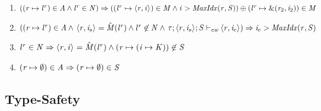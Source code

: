 \begin{enumerate}%
    \item \label{wf:impl-linear-alloc} $ ((\mathit{r} \mapsto {\mathit{l}}^{\mathit{r}}) \in \mathit{A} \wedge {\mathit{l}}^{\mathit{r}} \in \mathit{N}) \Rightarrow \\
          (({\mathit{l}}^{\mathit{r}} \mapsto \langle \mathit{r}, \mathit{i} \rangle ^{}) \in \mathit{M} \wedge
          \mathit{i} > \mathit{MaxIdx}(\mathit{r},\mathit{S}))
          \oplus
          ({\mathit{l}}^{\mathit{r}} \mapsto \text{\&}(\mathit{r}_2,\mathit{i}_2)) \in \mathit{M}
          $

    \item \label{wf:impl-linear-alloc2} $ ((\mathit{r} \mapsto {\mathit{l}}^{\mathit{r}}) \in \mathit{A} \wedge 
    \, \langle \mathit{r}, \mathit{i}_s \rangle ^{} = \hat{\mathit{M}}({\mathit{l}}^{\mathit{r}}) \wedge
    {\mathit{l}}^{\mathit{r}} \not \in \mathit{N} \wedge
    \, \mathit{\tau};\langle \mathit{r}, \mathit{i}_s \rangle ^{};\mathit{S} \vdash_{\textit{ew}} \langle \mathit{r}, \mathit{i}_e \rangle ^{}) \Rightarrow
          \mathit{i}_e > \mathit{MaxIdx}(\mathit{r},\mathit{S})
          $

    \item \label{wf:impl-write-once} $ {\mathit{l}}^{\mathit{r}} \in \mathit{N} \Rightarrow
          \langle \mathit{r}, \mathit{i} \rangle ^{} = \hat{\mathit{M}}({\mathit{l}}^{\mathit{r}}) \wedge
          (\mathit{r} \mapsto (\mathit{i} \mapsto \mathit{K})) \not \in \mathit{S}
          $

    \item \label{wf:impl-empty-region} $(\mathit{r} \mapsto \emptyset) \in \mathit{A} \Rightarrow
    (\mathit{r} \mapsto \emptyset) \in \mathit{S}$
\end{enumerate}



\subsection{Type-Safety}
\label{subsec:appendix-type-safety}


